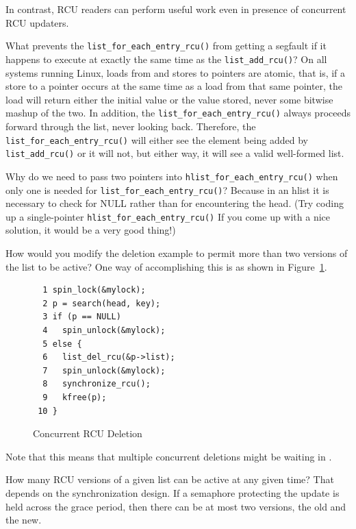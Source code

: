 \begin{enumerate}
	In contrast, RCU readers can perform useful work even in presence
	of concurrent RCU updaters.

\QuickQ{}
	What prevents the {\tt list\_for\_each\_entry\_rcu()} from
	getting a segfault if it happens to execute at exactly the same
	time as the {\tt list\_add\_rcu()}?
\QuickA{}
	On all systems running Linux, loads from and stores
	to pointers are atomic, that is, if a store to a pointer occurs at
	the same time as a load from that same pointer, the load will return
	either the initial value or the value stored, never some bitwise
	mashup of the two.
	In addition, the {\tt list\_for\_each\_entry\_rcu()} always proceeds
	forward through the list, never looking back.
	Therefore, the {\tt list\_for\_each\_entry\_rcu()} will either see
	the element being added by {\tt list\_add\_rcu()} or it will not,
	but either way, it will see a valid well-formed list.

\QuickQ{}
	Why do we need to pass two pointers into
	{\tt hlist\_for\_each\_entry\_rcu()}
	when only one is needed for {\tt list\_for\_each\_entry\_rcu()}?
\QuickA{}
	Because in an hlist it is necessary to check for
	NULL rather than for encountering the head.
	(Try coding up a single-pointer {\tt hlist\_for\_each\_entry\_rcu()}
	If you come up with a nice solution, it would be a very good thing!)

\QuickQ{}
	How would you modify the deletion example to permit more than two
	versions of the list to be active?
\QuickA{}
	One way of accomplishing this is as shown in
	Figure~\ref{fig:defer:Concurrent RCU Deletion}.

\begin{figure}[htbp]
{ \centering
\begin{verbatim}
  1 spin_lock(&mylock);
  2 p = search(head, key);
  3 if (p == NULL)
  4   spin_unlock(&mylock);
  5 else {
  6   list_del_rcu(&p->list);
  7   spin_unlock(&mylock);
  8   synchronize_rcu();
  9   kfree(p);
 10 }
\end{verbatim}
}
\caption{Concurrent RCU Deletion}
\label{fig:defer:Concurrent RCU Deletion}
\end{figure}

	Note that this means that multiple concurrent deletions might be
	waiting in .

\QuickQ{}
	How many RCU versions of a given list can be
	active at any given time?
\QuickA{}
	That depends on the synchronization design.
	If a semaphore protecting the update is held across the grace period,
	then there can be at most two versions, the old and the new.


\end{enumerate}
